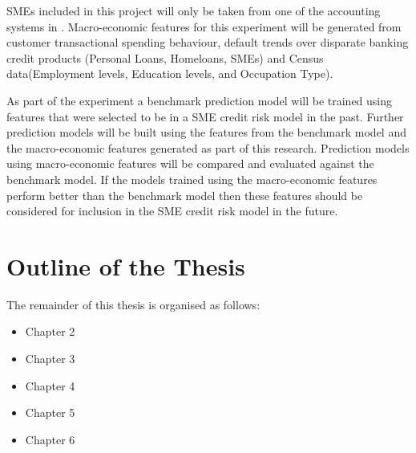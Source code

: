 SMEs included in this project will only be taken from one of the accounting systems in \subjectname. Macro-economic features for this experiment will be generated from customer transactional spending behaviour, default trends over disparate banking credit products (Personal Loans, Homeloans, SMEs) and Census data(Employment levels, Education levels, and Occupation Type). 

As part of the experiment a benchmark prediction model will be trained using features that were selected to be in a SME credit risk model in the past. Further prediction models will be built using the features from the benchmark model and the macro-economic features generated as part of this research. Prediction models using macro-economic features will be compared and evaluated against the benchmark model. If the models trained using the  macro-economic features perform better than the benchmark model then these features should be considered for inclusion in the SME credit risk model in the future. 



\section{Outline of the Thesis}
The remainder of this thesis is organised as follows:

\begin{itemize}
	\item Chapter 2
	\item Chapter 3
	\item Chapter 4
	\item Chapter 5
	\item Chapter 6
\end{itemize}


